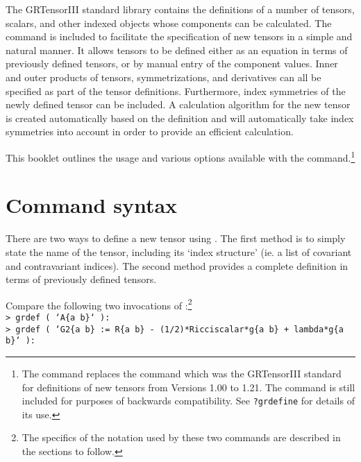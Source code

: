 \documentclass{article}
\begin{document}
\grlabel{\grDefLabel}
\grtitle{\grDefTitle}
\grtitlepage
\copyrightpage
\noindent The GRTensorIII standard library contains the definitions of
a number of tensors, scalars, and other indexed objects whose
components can be calculated. The  command is included to
facilitate the specification of new tensors in a simple and natural
manner.  It allows tensors to be defined either as an equation in
terms of previously defined tensors, or by manual entry of the
component values. Inner and outer products of tensors,
symmetrizations, and derivatives can all be specified as part of the
tensor definitions. Furthermore, index symmetries of the newly defined
tensor can be included. A calculation algorithm for the new tensor is
created automatically based on the definition and will automatically
take index symmetries into account in order to provide an efficient
calculation.

This booklet outlines the usage and various options available with the
 command.\footnote{The  command replaces the
 command which was the GRTensorIII standard for
definitions of new tensors from Versions 1.00 to 1.21. The
 command is still included for purposes of backwards
compatibility. See \texttt{?grdefine} for details of its use.}
%
\section{Command syntax}
%
There are two ways to define a new tensor using . The
first method is to simply state the name of the tensor, including its
`index structure' (ie. a list of covariant and contravariant
indices). The second method provides a complete definition in terms of
previously defined tensors.

Compare the following two invocations of :\footnote{The
specifics of the notation used by these two commands are described in
the sections to follow.}\\

\noindent\texttt{> grdef ( `A\{a b\}` ):}\\

\noindent\texttt{> grdef ( `G2\{a b\} := R\{a b\} - (1/2)*Ricciscalar*g\{a b\} 
                                   + lambda*g\{a b\}` ):}\\
\end{document}
